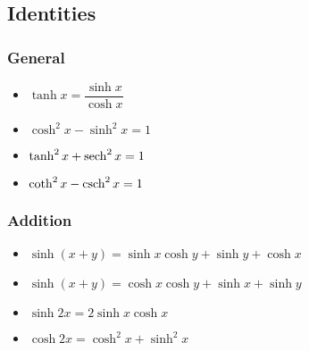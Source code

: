 \subsection{Identities}
\subsubsection{General}
\begin{itemize}
	\item $\tanh x = \dfrac{\sinh x}{\cosh x}$
	\item $\cosh^2 x - \sinh^2 x = 1$
	\item $\tanh^2 x + \operatorname{sech}^2 x= 1$
	\item $\coth^2 x - \operatorname{csch}^2 x = 1$
\end{itemize}
\subsubsection{Addition}
\begin{itemize}
	\item $\sinh(x+y)=\sinh x \cosh y + \sinh y + \cosh x$
	\item $\sinh(x+y)=\cosh x \cosh y + \sinh x + \sinh y$
	\item $\sinh 2x = 2\sinh x \cosh x$
	\item $\cosh 2x = \cosh^2 x + \sinh^2 x$
\end{itemize}
